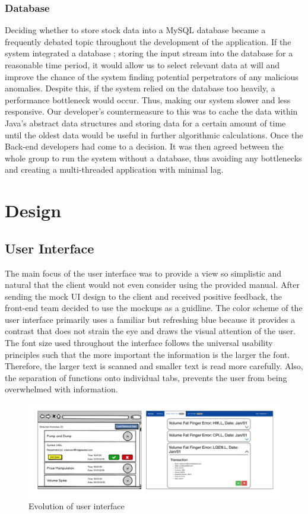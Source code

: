 \documentclass[12pt]{article}
\begin{document}
    \subsubsection{Database}
    Deciding whether to store stock data into a MySQL database became a frequently debated topic throughout the development of the application.
    If the system integrated a database ; storing the input stream into the database for a reasonable time period, it would allow us to
    select relevant data at will and improve the chance of the system finding potential perpetrators of any malicious anomalies.
    \newline
    Despite this, if the system relied on the database too heavily, a performance bottleneck would occur. Thus, making our system slower and less responsive.
    Our developer's countermeasure to this was to cache the data within Java's abstract data structures and storing data for a certain amount
    of time until the oldest data would be useful in further algorithmic calculations.
    \newline
    Once the Back-end developers had come to a decision. It was then agreed between the whole group to run the system without a database, thus avoiding
    any bottlenecks and creating a multi-threaded application with minimal lag.
\section{Design}
  \subsection{User Interface}
         The main focus of the user interface was to provide a view so simplistic and natural that the client would not even consider using the provided manual. After sending the mock UI design
         to the client and received positive feedback, the front-end team decided to use the mockups as a guidline.\newline
         The color scheme of the user interface primarily uses a familiar but refreshing blue because it provides a contrast that does not strain the eye and draws the visual attention of the user.
         The font size used throughout the interface follows the universal usability principles such that the more important the information is the larger the font. Therefore, the larger text is scanned
         and smaller text is read more carefully. Also, the separation of functions onto individual tabs, prevents the user from being overwhelmed with information.
         \begin{figure}[H]
         \centering
         \includegraphics[width=170mm]{ui1.png}
         \caption{Evolution of user interface}
         \end{figure}
\end{document}
